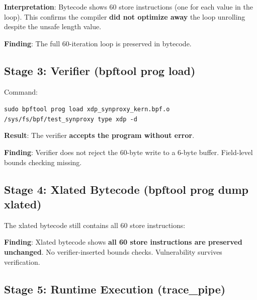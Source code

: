 \noindent
\textbf{Interpretation}: Bytecode shows 60 store instructions (one for each value in the loop). This confirms the compiler \textbf{did not optimize away} the loop unrolling despite the unsafe length value.

\noindent
\textbf{Finding}: The full 60-iteration loop is preserved in bytecode.

\subsection{Stage 3: Verifier (bpftool prog load)}

Command:
\begin{tcolorbox}[colback=gray!10, colframe=gray!10, arc=2pt, boxrule=0pt]
\small\ttfamily
\texttt{sudo bpftool prog load xdp\_synproxy\_kern.bpf.o /sys/fs/bpf/test\_synproxy type xdp -d}
\end{tcolorbox}

\noindent
\textbf{Result}: The verifier \textbf{accepts the program without error}.

\noindent
\textbf{Finding}: Verifier does not reject the 60-byte write to a 6-byte buffer. Field-level bounds checking missing.

\subsection{Stage 4: Xlated Bytecode (bpftool prog dump xlated)}

The xlated bytecode still contains all 60 store instructions:

\vspace{0.3cm}
\noindent
{}
\vspace{0.3cm}

\noindent
\textbf{Finding}: Xlated bytecode shows \textbf{all 60 store instructions are preserved unchanged}. No verifier-inserted bounds checks. Vulnerability survives verification.

\subsection{Stage 5: Runtime Execution (trace\_pipe)}

